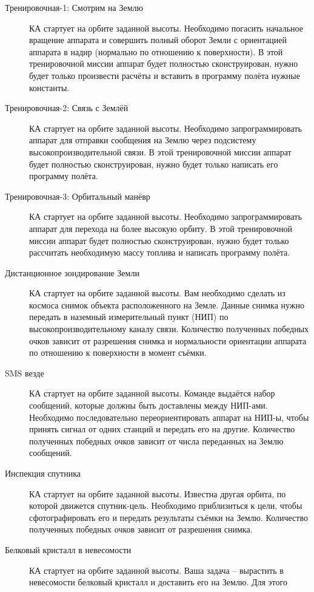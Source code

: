 \documentclass[12pt,a4paper]{article}
\begin{document}
\begin{description}
  \item[Тренировочная-1: Смотрим на Землю] КА стартует на орбите заданной
    высоты. Необходимо погасить начальное вращение аппарата и совершить полный оборот
    Земли с ориентацией аппарата в надир (нормально по отношению к поверхности). В этой
    тренировочной миссии аппарат будет полностью сконструирован, нужно будет только
    произвести расчёты и вставить в программу полёта нужные константы.
  \item[Тренировочная-2: Связь с Землёй] КА стартует на орбите заданной
    высоты. Необходимо запрограммировать аппарат для отправки сообщения на Землю через
    подсистему высокопроизводительной связи. В этой тренировочной миссии аппарат будет
    полностью сконструирован, нужно будет только написать его программу полёта.
  \item[Тренировочная-3: Орбитальный манёвр] КА стартует на орбите заданной
    высоты. Необходимо запрограммировать аппарат для перехода на более высокую орбиту. В
    этой тренировочной миссии аппарат будет полностью сконструирован, нужно будет только
    рассчитать необходимую массу топлива и написать программу полёта.
  \item[Дистанционное зондирование Земли] КА стартует на орбите заданной высоты. Вам
    необходимо сделать из космоса снимок объекта расположенного на Земле. Данные снимка
    нужно передать в наземный измерительный пункт (НИП) по высокопроизводительному каналу
    связи. Количество полученных победных очков зависит от разрешения снимка и
    нормальности ориентации аппарата по отношению к поверхности в момент съёмки.
  \item[SMS везде] КА стартует на орбите заданной высоты. Команде выдаётся набор
    сообщений, которые должны быть доставлены между НИП-ами. Необходимо последовательно
    переориентировать аппарат на НИП-ы, чтобы принять сигнал от одних станций и передать
    его на другие. Количество полученных победных очков зависит от числа переданных на
    Землю сообщений.
  \item[Инспекция спутника] КА стартует на орбите заданной высоты. Известна другая орбита,
    по которой движется спутник-цель. Необходимо приблизиться к цели, чтобы
    сфотографировать его и передать результаты съёмки на Землю. Количество полученных
    победных очков зависит от разрешения снимка.
  \item[Белковый кристалл в невесомости] КА стартует на орбите заданной высоты. Ваша
    задача – вырастить в невесомости белковый кристалл и доставить его на Землю. Для этого

\end{description}
\end{document}
